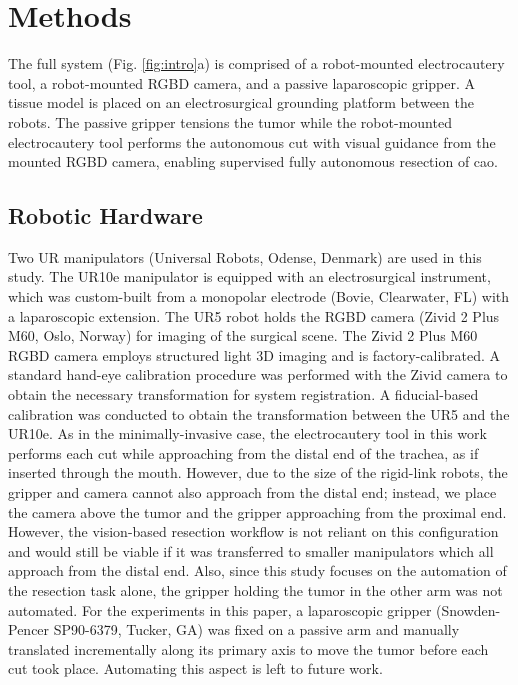 \section{Methods}

The full system (Fig. \ref{fig:intro}a) is comprised of a robot-mounted electrocautery tool, a robot-mounted RGBD camera, and a passive laparoscopic gripper. A tissue model is placed on an electrosurgical grounding platform between the robots. The passive gripper tensions the tumor while the robot-mounted electrocautery tool performs the autonomous cut with visual guidance from the mounted RGBD camera, enabling supervised fully autonomous resection of \gls{cao}.


\subsection{Robotic Hardware}

Two UR manipulators (Universal Robots, Odense, Denmark) are used in this study. The UR10e manipulator is equipped with an electrosurgical instrument, which was custom-built from a monopolar electrode (Bovie, Clearwater, FL) with a laparoscopic extension. The UR5 robot holds the RGBD camera (Zivid 2 Plus M60, Oslo, Norway) for imaging of the surgical scene. The Zivid 2 Plus M60 RGBD camera employs structured light 3D imaging and is factory-calibrated. A standard hand-eye calibration procedure was performed with the Zivid camera to obtain the necessary transformation for system registration. A fiducial-based calibration was conducted to obtain the transformation between the UR5 and the UR10e. As in the minimally-invasive case, the electrocautery tool in this work performs each cut while approaching from the distal end of the trachea, as if inserted through the mouth. However, due to the size of the rigid-link robots, the gripper and camera cannot also approach from the distal end; instead, we place the camera above the tumor and the gripper approaching from the proximal end. However, the vision-based resection workflow is not reliant on this configuration and would still be viable if it was transferred to smaller manipulators which all approach from the distal end. Also, since this study focuses on the automation of the resection task alone, the gripper holding the tumor in the other arm was not automated. For the experiments in this paper, a laparoscopic gripper (Snowden-Pencer SP90-6379, Tucker, GA) was fixed on a passive arm and manually translated incrementally along its primary axis to move the tumor before each cut took place. Automating this aspect is left to future work.


